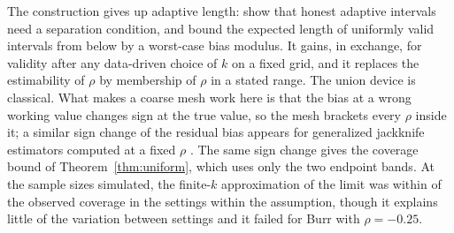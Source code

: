 \documentclass[11pt]{article}
\theoremstyle{definition}
\theoremstyle{remark}
\numberwithin{equation}{section}
\begin{document}
The construction gives up adaptive length: \citet{carpentierkim2014} show that honest adaptive intervals need a separation condition, and \citet{sasakiwang2024} bound the expected length of uniformly valid intervals from below by a worst-case bias modulus. It gains, in exchange, for validity after any data-driven choice of $k$ on a fixed grid, and it replaces the estimability of $\rho$ by membership of $\rho$ in a stated range. The union device is classical. What makes a coarse mesh work here is that the bias at a wrong working value changes sign at the true value, so the mesh brackets every $\rho$ inside it; a similar sign change of the residual bias appears for generalized jackknife estimators computed at a fixed $\rho$ \citep{gomesmartinsneves2002}. The same sign change gives the coverage bound of Theorem~\ref{thm:uniform}, which uses only the two endpoint bands. At the sample sizes simulated, the finite-$k$ approximation of the limit was within \diffAbsMax{} of the observed coverage in the settings within the assumption, though it explains little of the variation between settings and it failed for Burr with $\rho=-0.25$.
\end{document}
